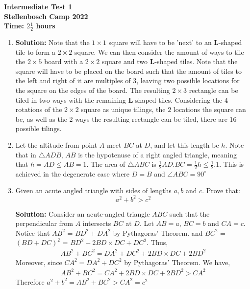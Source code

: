 \documentclass{article}
\begin{document}
\thispagestyle{empty}

\begin{center}
  \textbf{\Large Intermediate Test 1}
  \\ \vspace{1em}
  \textbf{\large Stellenbosch Camp 2022}
  \\ \vspace{1em}
  \textbf{\large Time: $2\frac{1}{2}$ hours}
\end{center}

\bigskip

\begin{enumerate}[itemsep=\fill]
	


\item %
\textbf{Solution:} Note that the $1\times1$ square will have to be 'next' to an $\mathbf{L}$-shaped tile to form a $2\times2$ square. We can then consider the amount of ways to tile the $2\times5$ board with a $2\times2$ square and two $\mathbf{L}$-shaped tiles. Note that the square will have to be placed on the board such that the amount of tiles to the left and right of it are multiples of $3$, leaving two possible locations for the square on the edges of the board. The resulting $2\times3$ rectangle can be tiled in two ways with the remaining $\mathbf{L}$-shaped tiles. Considering the $4$ rotations of the $2\times2$ square as unique tilings, the $2$ locations the square can be, as well as the $2$ ways the resulting rectangle can be tiled, there are $16$ possible tilings. 


\item %
Let the altitude from point $A$ meet $BC$ at $D$, and let this length be $h$. Note that in $\triangle ADB$, $AB$ is the hypotenuse of a right angled triangle, meaning that $h = AD \leq AB = 1$. The area of $\triangle ABC$ is $\frac{1}{2}AD.BC = \frac{1}{2}h \leq \frac{1}{2}.1$. This is achieved in the degenerate case where $D = B$ and $\angle ABC = 90^{\circ}$

\item %
Given an acute angled triangle with sides of lengths $a,b$ and $c$. Prove that: \[a^2 + b^2 > c^2\]

\textbf{Solution:} Consider an acute-angled triangle $ABC$ such that the perpendicular from $A$ intersects $BC$ at $D$. Let $AB=a$, $BC=b$ and $CA=c$. Notice that $AB^{2}$ = $BD^{2} + DA^{2}$ by Pythagoras' Theorem.  and $BC^{2}$ = $(BD + DC)^{2}$ = $BD^{2} + 2BD\times DC + DC^{2}$. Thus,
\begin{align*}
    AB^{2} + BC^{2} = DA^{2} + DC^{2} + 2BD \times DC + 2BD^{2}
\end{align*}
Moreover, since $CA^{2} = DA^{2} + DC^{2}$ by Pythagoras' Theorem. We have,
\begin{align*}
    AB^{2} + BC^{2} = CA^{2} + 2BD \times DC + 2BD^{2} > CA^{2}  
\end{align*}
Therefore $a^{2} + b^{2} = AB^{2} + BC^{2} > CA^{2} = c^{2}$



\end{enumerate}
\end{document}
